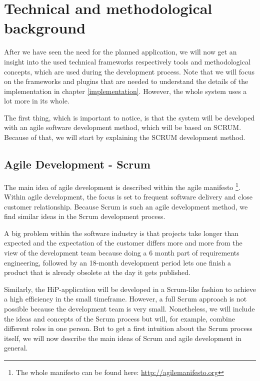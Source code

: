\chapter[Technical and methodological background]{Technical and methodological background}
\label{background}
After we have seen the need for the planned application, we will now get an insight into the used technical frameworks respectively tools and methodological concepts, which are used during the development process.  Note that we will focus on the frameworks and plugins that are needed to understand the details of the implementation in chapter \ref{implementation}. However, the whole system uses a lot more in its whole.

The first thing, which is important to notice, is that the system will be developed with an agile software development method, which will be based on SCRUM. Because of that, we will start by explaining the SCRUM development method.

\section{Agile Development - Scrum}
\label{SCRUM-intro}
The main idea of agile development is described within the agile manifesto \cite{Beck2001agile}\footnote{The whole manifesto can be found here: \url{http://agilemanifesto.org}}. Within agile development, the focus is set to frequent software delivery and close customer relationship. Because Scrum is such an agile development method, we find similar ideas in the Scrum development process.

A big problem within the software industry is that projects take longer than expected and the expectation of the customer differs more and more from the view of the development team because doing a 6 month part of requirements engineering, followed by an 18-month development period lets one finish a product that is already obsolete at the day it gets published.

Similarly, the HiP-application will be developed in a Scrum-like fashion to achieve a high efficiency in the small timeframe. However, a full Scrum approach is not possible because the development team is very small. Nonetheless, we will include the ideas and concepts of the Scrum process but will, for example, combine different roles in one person. But to get a first intuition about the Scrum process itself, we will now describe the main ideas of Scrum and agile development in general.

